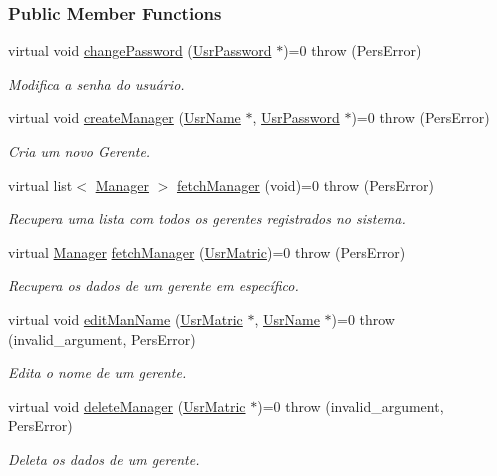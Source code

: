 \subsubsection*{Public Member Functions}
\begin{DoxyCompactItemize}
\item 
virtual void \hyperlink{classUserManAdm_a75006ea396a6384bbf47918fe9316bce}{change\-Password} (\hyperlink{classUsrPassword}{Usr\-Password} $\ast$)=0  throw (\-Pers\-Error)
\begin{DoxyCompactList}\small\item\em Modifica a senha do usuário. \end{DoxyCompactList}\item 
virtual void \hyperlink{classUserManAdm_a4c1d61e8190867eb786cdf97083ba289}{create\-Manager} (\hyperlink{classUsrName}{Usr\-Name} $\ast$, \hyperlink{classUsrPassword}{Usr\-Password} $\ast$)=0  throw (\-Pers\-Error)
\begin{DoxyCompactList}\small\item\em Cria um novo Gerente. \end{DoxyCompactList}\item 
virtual list$<$ \hyperlink{classManager}{Manager} $>$ \hyperlink{classUserManAdm_a05b8b4f5b1e42b7b9f77d6a40b90dbb2}{fetch\-Manager} (void)=0  throw (\-Pers\-Error)
\begin{DoxyCompactList}\small\item\em Recupera uma lista com todos os gerentes registrados no sistema. \end{DoxyCompactList}\item 
virtual \hyperlink{classManager}{Manager} \hyperlink{classUserManAdm_a62e826d1c11061df021016e94e88f9ba}{fetch\-Manager} (\hyperlink{classUsrMatric}{Usr\-Matric})=0  throw (\-Pers\-Error)
\begin{DoxyCompactList}\small\item\em Recupera os dados de um gerente em específico. \end{DoxyCompactList}\item 
virtual void \hyperlink{classUserManAdm_a0440de1c9d712a8dac1aa4e526d0fe9b}{edit\-Man\-Name} (\hyperlink{classUsrMatric}{Usr\-Matric} $\ast$, \hyperlink{classUsrName}{Usr\-Name} $\ast$)=0  throw (invalid\-\_\-argument, Pers\-Error)
\begin{DoxyCompactList}\small\item\em Edita o nome de um gerente. \end{DoxyCompactList}\item 
virtual void \hyperlink{classUserManAdm_a3fd6ddb6b71743fe5ece3100206023c3}{delete\-Manager} (\hyperlink{classUsrMatric}{Usr\-Matric} $\ast$)=0  throw (invalid\-\_\-argument, Pers\-Error)
\begin{DoxyCompactList}\small\item\em Deleta os dados de um gerente. \end{DoxyCompactList}\end{DoxyCompactItemize}


